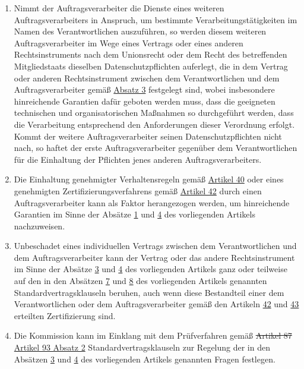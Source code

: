 \begin{enumerate}
  \item Nimmt der Auftragsverarbeiter die Dienste eines weiteren Auftragsverarbeiters in Anspruch, um bestimmte
   Verarbeitungstätigkeiten im Namen des Verantwortlichen auszuführen, so werden diesem weiteren Auftragsverarbeiter im
   Wege eines Vertrags oder eines anderen Rechtsinstruments nach dem Unionsrecht oder dem Recht des betreffenden
   Mitgliedstaats dieselben Datenschutzpflichten auferlegt, die in dem Vertrag oder anderen Rechtsinstrument zwischen
   dem Verantwortlichen und dem Auftragsverarbeiter gemäß \hyperref[itm:28-3-1]{Absatz 3} festgelegt sind, wobei
   insbesondere hinreichende Garantien dafür geboten werden muss, dass die geeigneten technischen und organisatorischen
   Maßnahmen so durchgeführt werden, dass die Verarbeitung entsprechend den Anforderungen dieser Verordnung erfolgt.
   Kommt der weitere Auftragsverarbeiter seinen Datenschutzpflichten nicht nach, so haftet der erste
   Auftragsverarbeiter gegenüber dem Verantwortlichen für die Einhaltung der Pflichten jenes anderen
   Auftragsverarbeiters.
  \label{itm:28-4}

  \item Die Einhaltung genehmigter Verhaltensregeln gemäß \hyperref[ch:40]{Artikel 40} oder eines genehmigten
   Zertifizierungsverfahrens gemäß \hyperref[ch:42]{Artikel 42} durch einen Auftragsverarbeiter kann als Faktor
   herangezogen werden, um hinreichende Garantien im Sinne der Absätze \hyperref[itm:28-1]{1} und \hyperref[itm:28-4]
   {4} des vorliegenden Artikels nachzuweisen.
  \label{itm:28-5}

  \item Unbeschadet eines individuellen Vertrags zwischen dem Verantwortlichen und dem Auftragsverarbeiter kann der
   Vertrag oder das andere Rechtsinstrument im Sinne der Absätze \hyperref[itm:28-3-1]{3} und \hyperref[itm:28-4]{4} des
   vorliegenden Artikels ganz oder teilweise auf den in den Absätzen \hyperref[itm:28-7]{7} und \hyperref[itm:28-8]
   {8} des vorliegenden Artikels genannten Standardvertragsklauseln beruhen, auch wenn diese Bestandteil einer dem
   Verantwortlichen oder dem Auftragsverarbeiter gemäß den Artikeln \hyperref[ch:42]{42} und \hyperref[ch:43]{43}
   erteilten Zertifizierung sind.
  \label{itm:28-6}

  \item Die Kommission kann im Einklang mit dem Prüfverfahren gemäß \sout{Artikel 87} \hyperref[itm:93-2]{Artikel 93
   Absatz 2} Standardvertragsklauseln zur Regelung der in den Absätzen \hyperref[itm:28-3-1]{3} und \hyperref[itm:28-4]
   {4} des vorliegenden Artikels genannten Fragen festlegen.
  \label{itm:28-7}


\end{enumerate}
